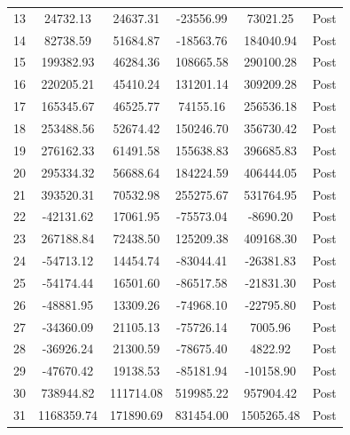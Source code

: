 \documentclass[bibtex]{article}
\begin{document}
{\begin{longtable}{cccccc}
13 & 24732.13 & 24637.31 & -23556.99 & 73021.25 & Post \\
14 & 82738.59 & 51684.87 & -18563.76 & 184040.94 & Post \\
15 & 199382.93 & 46284.36 & 108665.58 & 290100.28 & Post \\
16 & 220205.21 & 45410.24 & 131201.14 & 309209.28 & Post \\
17 & 165345.67 & 46525.77 & 74155.16 & 256536.18 & Post \\
18 & 253488.56 & 52674.42 & 150246.70 & 356730.42 & Post \\
19 & 276162.33 & 61491.58 & 155638.83 & 396685.83 & Post \\
20 & 295334.32 & 56688.64 & 184224.59 & 406444.05 & Post \\
21 & 393520.31 & 70532.98 & 255275.67 & 531764.95 & Post \\
22 & -42131.62 & 17061.95 & -75573.04 & -8690.20 & Post \\
23 & 267188.84 & 72438.50 & 125209.38 & 409168.30 & Post \\
24 & -54713.12 & 14454.74 & -83044.41 & -26381.83 & Post \\
25 & -54174.44 & 16501.60 & -86517.58 & -21831.30 & Post \\
26 & -48881.95 & 13309.26 & -74968.10 & -22795.80 & Post \\
27 & -34360.09 & 21105.13 & -75726.14 & 7005.96 & Post \\
28 & -36926.24 & 21300.59 & -78675.40 & 4822.92 & Post \\
29 & -47670.42 & 19138.53 & -85181.94 & -10158.90 & Post \\
30 & 738944.82 & 111714.08 & 519985.22 & 957904.42 & Post \\
31 & 1168359.74 & 171890.69 & 831454.00 & 1505265.48 & Post \\
\end{longtable}

}
\end{document}
